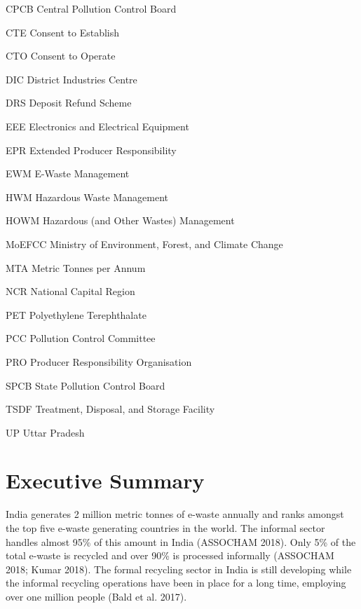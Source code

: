 \documentclass[a4paper, 12pt]{article}
\begin{document}
        \begin{abbrv}
         
        \item[CPCB]			Central Pollution Control Board
        \item[CTE]				Consent to Establish
        \item[CTO]			Consent to Operate
        \item[DIC]				District Industries Centre
        \item[DRS]			Deposit Refund Scheme
        \item[EEE]				Electronics and Electrical Equipment 
        \item[EPR]				Extended Producer Responsibility 
        \item[EWM]			E-Waste Management
        \item[HWM]			Hazardous Waste Management
        \item[HOWM]			Hazardous (and Other Wastes) Management
        \item[MoEFCC]			Ministry of Environment, Forest, and Climate Change
        \item[MTA]				Metric Tonnes per Annum
        \item[NCR]			National Capital Region
        \item[PET]				Polyethylene Terephthalate
        \item[PCC]			Pollution Control Committee
        \item[PRO]			Producer Responsibility Organisation
        \item[SPCB]			State Pollution Control Board
        \item[TSDF]			Treatment, Disposal, and Storage Facility
        \item[UP]				Uttar Pradesh
        
        
         
        \end{abbrv}
        
                    
                    \newpage
                    \section*{Executive Summary}
                    India generates 2 million metric tonnes of e-waste annually and ranks amongst the top five e-waste generating countries in the world. The informal sector handles almost 95\% of this amount in India \parencite{stigler1971theory} (ASSOCHAM 2018). Only 5\% of the total e-waste is recycled and over 90\% is processed informally (ASSOCHAM 2018; Kumar 2018). The formal recycling sector in India is still developing while the informal recycling operations have been in place for a long time, employing over one million people (Bald et al. 2017).  \\
                    
\end{document}
